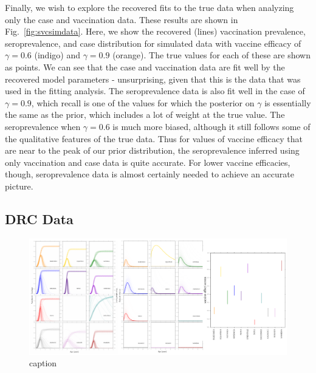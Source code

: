 \documentclass[nofootinbib,aps,pre,twocolumn,superscriptaddress,showkeys,showpacs]{revtex4-1}
\begin{document}
Finally, we wish to explore the recovered fits to the true data when analyzing only the case and vaccination data. These results are shown in Fig.~\ref{fig:svcsimdata}. Here, we show the recovered (lines) vaccination prevalence, seroprevalence, and case distribution for simulated data with vaccine efficacy of $\gamma = 0.6$ (indigo) and $\gamma = 0.9$ (orange). The true values for each of these are shown as points. We can see that the case and vaccination data are fit well by the recovered model parameters - unsurprising, given that this is the data that was used in the fitting analysis. The seroprevalence data is also fit well in the case of $\gamma = 0.9$, which recall is one of the values for which the posterior on $\gamma$ is essentially the same as the prior, which includes a lot of weight at the true value. The seroprevalence when $\gamma = 0.6$ is much more biased, although it still follows some of the qualitative features of the true data. Thus for values of vaccine efficacy that are near to the peak of our prior distribution, the seroprevalence inferred using only vaccination and case data is quite accurate. For lower vaccine efficacies, though, seroprevalence data is almost certainly needed to achieve an accurate picture.


\subsection{DRC Data \label{subsec:DRC}}
\begin{figure}
\includegraphics[width=\textwidth,angle=0]{figures/VaccFOIveff-crop.pdf}
\caption{caption\label{fig:foivaccveff}}
\end{figure}
\end{document}
